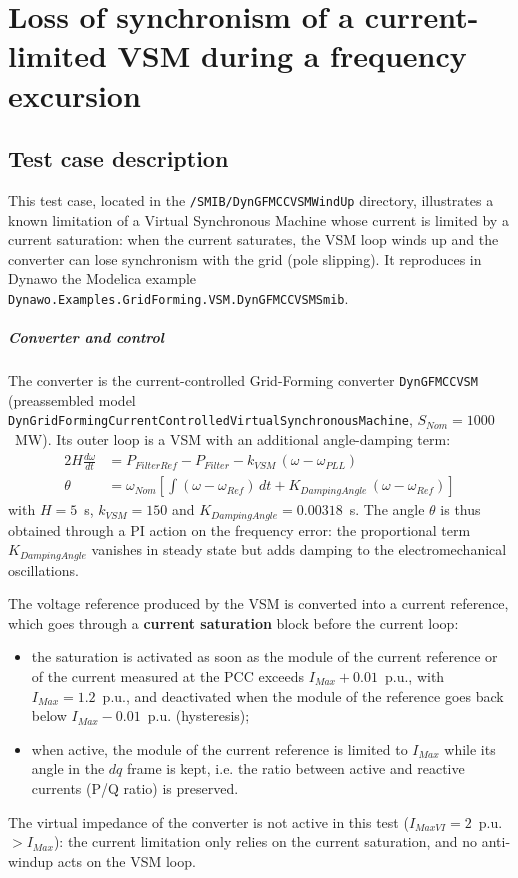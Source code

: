 \documentclass[a4paper, 12pt]{report}
\begin{document}
\chapter*{Loss of synchronism of a current-limited VSM during a frequency excursion}
\section*{Test case description}
This test case, located in the \texttt{/SMIB/DynGFMCCVSMWindUp} directory, illustrates a known limitation of a Virtual Synchronous Machine whose current is limited by a current saturation: when the current saturates, the VSM loop winds up and the converter can lose synchronism with the grid (pole slipping). It reproduces in Dynawo the Modelica example \texttt{Dynawo.\allowbreak Examples.\allowbreak GridForming.\allowbreak VSM.\allowbreak DynGFMCCVSMSmib}.

\paragraph{Converter and control}
The converter is the current-controlled Grid-Forming converter \texttt{DynGFMCCVSM} (preassembled model \texttt{DynGridFormingCurrent\allowbreak ControlledVirtualSynchronousMachine}, $S_{Nom} = 1000$~MW). Its outer loop is a VSM with an additional angle-damping term:
\begin{align*}
2H \frac{d\omega}{dt} &= P_{FilterRef} - P_{Filter} - k_{VSM}\,(\omega - \omega_{PLL}) \\
\theta &= \omega_{Nom} \left[ \int (\omega - \omega_{Ref})\,dt + K_{DampingAngle}\,(\omega - \omega_{Ref}) \right]
\end{align*}
with $H = 5$~s, $k_{VSM} = 150$ and $K_{DampingAngle} = 0.00318$~s. The angle $\theta$ is thus obtained through a PI action on the frequency error: the proportional term $K_{DampingAngle}$ vanishes in steady state but adds damping to the electromechanical oscillations.

The voltage reference produced by the VSM is converted into a current reference, which goes through a \textbf{current saturation} block before the current loop:
\begin{itemize}
\item the saturation is activated as soon as the module of the current reference or of the current measured at the PCC exceeds $I_{Max} + 0.01$~p.u., with $I_{Max} = 1.2$~p.u., and deactivated when the module of the reference goes back below $I_{Max} - 0.01$~p.u. (hysteresis);
\item when active, the module of the current reference is limited to $I_{Max}$ while its angle in the $dq$ frame is kept, i.e. the ratio between active and reactive currents (P/Q ratio) is preserved.
\end{itemize}
The virtual impedance of the converter is not active in this test ($I_{MaxVI} = 2$~p.u. $> I_{Max}$): the current limitation only relies on the current saturation, and no anti-windup acts on the VSM loop.
\end{document}

